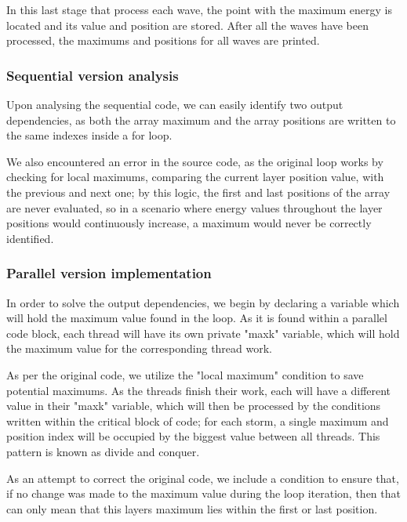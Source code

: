 
In this last stage that process each wave, the
point with the maximum energy is located and its value and position are stored.
After all the waves have been processed, the maximums and positions for all waves
are printed.
\subsubsection{Sequential version analysis}
Upon analysing the sequential code, we can easily identify two output dependencies, as both the array maximum and the array positions are written to the same indexes inside a for loop. 

We also encountered an error in the source code, as the original loop works by checking for local maximums, comparing the current layer position value, with the previous and next one; by this logic, the first and last positions of the array are never evaluated, so in a scenario where energy values throughout the layer positions would continuously increase, a maximum would never be correctly identified.
\subsubsection{Parallel version implementation}
In order to solve the output dependencies, we begin by declaring a variable which will hold the maximum value found in the loop. As it is found within a parallel code block, each thread will have its own private "maxk" variable, which will hold the maximum value for the corresponding thread work.

As per the original code, we utilize the "local maximum" condition to save potential maximums. As the threads finish their work, each will have a different value in their "maxk" variable, which will then be processed by the conditions written within the critical block of code; for each storm, a single maximum and position index will be occupied by the biggest value between all threads. This pattern is known as divide and conquer.

As an attempt to correct the original code, we include a condition to ensure that, if no change was made to the maximum value during the loop iteration, then that can only mean that this layers maximum lies within the first or last position.